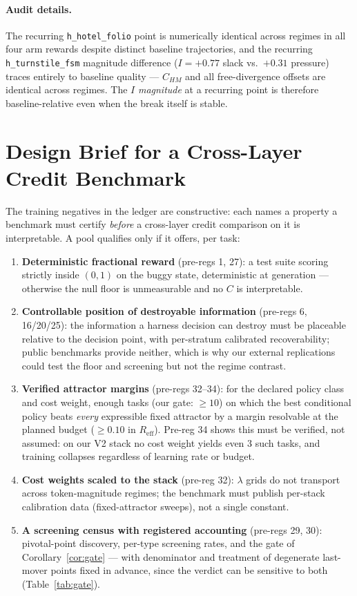 \documentclass{article}
\theoremstyle{remark}
\begin{document}
\paragraph{Audit details.} The recurring \texttt{h\_hotel\_folio} point is
numerically identical across regimes in all four arm rewards despite
distinct baseline trajectories, and the recurring \texttt{h\_turnstile\_fsm}
magnitude difference ($I=+0.77$ slack vs.\ $+0.31$ pressure) traces entirely
to baseline quality --- $C_{HM}$ and all free-divergence offsets are
identical across regimes. The $I$ \emph{magnitude} at a recurring point is
therefore baseline-relative even when the break itself is stable.

\section{Design Brief for a Cross-Layer Credit Benchmark}
\label{app:brief}
The training negatives in the ledger are constructive: each names a
property a benchmark must certify \emph{before} a cross-layer credit
comparison on it is interpretable. A pool qualifies only if it offers, per
task:
\begin{enumerate}
\item \textbf{Deterministic fractional reward} (pre-regs 1, 27): a test
suite scoring strictly inside $(0,1)$ on the buggy state, deterministic at
generation --- otherwise the null floor is unmeasurable and no $C$ is
interpretable.
\item \textbf{Controllable position of destroyable information} (pre-regs
6, 16/20/25): the information a harness decision can destroy must be
placeable relative to the decision point, with per-stratum calibrated
recoverability; public benchmarks provide neither, which is why our
external replications could test the floor and screening but not the
regime contrast.
\item \textbf{Verified attractor margins} (pre-regs 32--34): for the
declared policy class and cost weight, enough tasks (our gate: $\geq 10$)
on which the best conditional policy beats \emph{every} expressible fixed
attractor by a margin resolvable at the planned budget ($\geq 0.10$ in
$R_{\text{eff}}$). Pre-reg 34 shows this must be verified, not assumed:
on our V2 stack no cost weight yields even 3 such tasks, and training
collapses regardless of learning rate or budget.
\item \textbf{Cost weights scaled to the stack} (pre-reg 32): $\lambda$
grids do not transport across token-magnitude regimes; the benchmark must
publish per-stack calibration data (fixed-attractor sweeps), not a single
constant.
\item \textbf{A screening census with registered accounting} (pre-regs 29,
30): pivotal-point discovery, per-type screening rates, and the gate of
Corollary~\ref{cor:gate} --- with denominator and treatment of degenerate
last-mover points fixed in advance, since the verdict can be sensitive to
both (Table~\ref{tab:gate}).
\end{enumerate}
\end{document}
